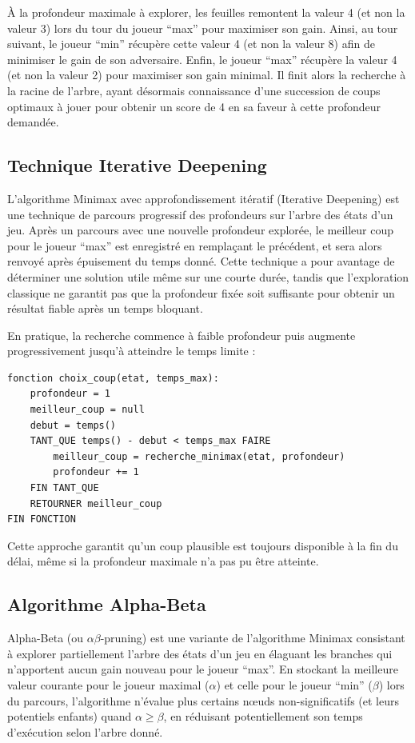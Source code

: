 \documentclass[11pt]{article}
\begin{document}
À la profondeur maximale à explorer, les feuilles remontent la valeur 4 (et non la valeur 3) lors du tour du joueur “max” pour maximiser son gain. 
Ainsi, au tour suivant, le joueur “min” récupère cette valeur 4 (et non la valeur 8) afin de minimiser le gain de son adversaire. 
Enfin, le joueur “max” récupère la valeur 4 (et non la valeur 2) pour maximiser son gain minimal. 
Il finit alors la recherche à la racine de l’arbre, ayant désormais connaissance d’une succession de coups optimaux à jouer pour obtenir un score de 4 en sa faveur à cette profondeur demandée.

\subsection{Technique Iterative Deepening}

L'algorithme Minimax avec approfondissement itératif (Iterative Deepening) est une technique de parcours progressif des profondeurs sur l’arbre des états d’un jeu. 
Après un parcours avec une nouvelle profondeur explorée, le meilleur coup pour le joueur “max” est enregistré en remplaçant le précédent, et sera alors renvoyé après épuisement du temps donné. 
Cette technique a pour avantage de déterminer une solution utile même sur une courte durée, tandis que l’exploration classique ne garantit pas que la profondeur fixée soit suffisante pour obtenir un résultat fiable après un temps bloquant.

En pratique, la recherche commence à faible profondeur puis augmente progressivement jusqu’à atteindre le temps limite :
{\normalsize
  \begin{verbatim}
fonction choix_coup(etat, temps_max):
    profondeur = 1
    meilleur_coup = null
    debut = temps()
    TANT_QUE temps() - debut < temps_max FAIRE
        meilleur_coup = recherche_minimax(etat, profondeur)
        profondeur += 1
    FIN TANT_QUE
    RETOURNER meilleur_coup
FIN FONCTION
  \end{verbatim}
}

Cette approche garantit qu’un coup plausible est toujours disponible à la fin du délai, même si la profondeur maximale n’a pas pu être atteinte.

\subsection{Algorithme Alpha-Beta}

Alpha-Beta (ou $\alpha\beta$-pruning) est une variante de l'algorithme Minimax consistant à explorer partiellement l’arbre des états d’un jeu en élaguant les branches qui n’apportent aucun gain nouveau pour le joueur “max”.\cite{alpha_beta}
En stockant la meilleure valeur courante pour le joueur maximal ($\alpha$) et celle pour le joueur “min” ($\beta$) lors du parcours, l’algorithme n’évalue plus certains nœuds non-significatifs (et leurs potentiels enfants) quand $\alpha \geq \beta$, en réduisant potentiellement son temps d'exécution selon l’arbre donné.
\end{document}
